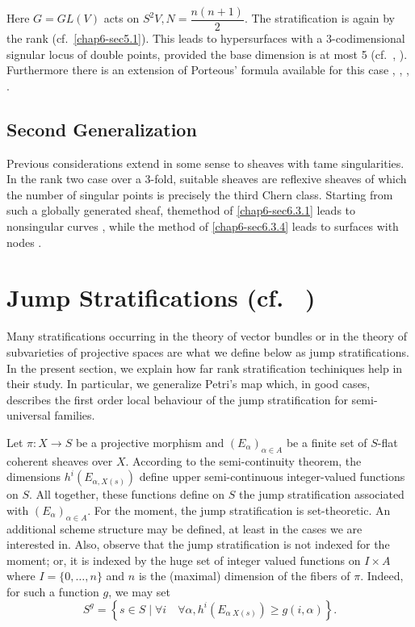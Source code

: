 Here $G=GL(V)$ acts on $S^{2}V,N=\dfrac{n(n+1)}{2}$. The
stratification is again by the rank (cf.~\ref{chap6-sec5.1}). This
leads to hypersurfaces with a 3-codimensional signular locus of double
points, provided the base dimension is at most 5
(cf.~\cite{chap6-C}, \cite{chap6-B4}). Furthermore there is an
extension of Porteous' formula available for this
case \cite{chap6-JLP}, \cite{chap6-Tu}, \cite{chap6-HaT1}, \cite{chap6-HaT2}.

\subsection{Second Generalization}\label{chap6-sec6.4}

Previous considerations extend in some sense to sheaves with tame
singularities. In the rank two case over a 3-fold, suitable sheaves
are reflexive sheaves of which the number of singular points is
precisely the third Chern class. Starting from such a globally
generated sheaf, the\pageoriginale method of \ref{chap6-sec6.3.1} leads
to nonsingular curves \cite{chap6-HH0}, while the method
of \ref{chap6-sec6.3.4} leads to surfaces with
nodes \cite{chap6-HM}. 

\section{Jump Stratifications (cf.~ \texorpdfstring{\cite[\S\
1]{chap6-BH2}}{Cite})}\label{chap6-sec7}

Many stratifications occurring in the theory of vector bundles or in
the theory of subvarieties of projective spaces are what we define
below as jump stratifications. In the present section, we explain how
far rank stratification techiniques help in their study. In
particular, we generalize Petri's map which, in good cases, describes
the first order local behaviour of the jump stratification for
semi-universal families.

\begin{definition}\label{chap6-defi7.1}
Let $\pi:X\to S$ be a projective morphism and $(E_{\alpha})_{\alpha\in
A}$ be a finite set of $S$-flat coherent sheaves over $X$. According
to the semi-continuity theorem, the dimensions
$h^{i}(E_{\alpha,X(s)})$ define upper semi-continuous integer-valued
functions on $S$. All together, these functions define on $S$ the jump
stratification associated with $(E_{\alpha})_{\alpha\in A}$. For the
moment, the jump stratification is set-theoretic. An additional scheme
structure may be defined, at least in the cases we are interested
in. Also, observe that the jump stratification is not indexed for the
moment; or, it is indexed by the huge set of integer valued functions
on $I\times A$ where $I=\{0,\ldots,n\}$ and $n$ is the (maximal)
dimension of the fibers of $\pi$. Indeed, for such a function $g$, we
may set
$$
S^{g}=\left\{s\in S\mid \forall i\quad \forall \alpha, h^{i}(E_{\alpha\
X(s)})\geq g(i,\alpha)\right\}.
$$
\end{definition}

